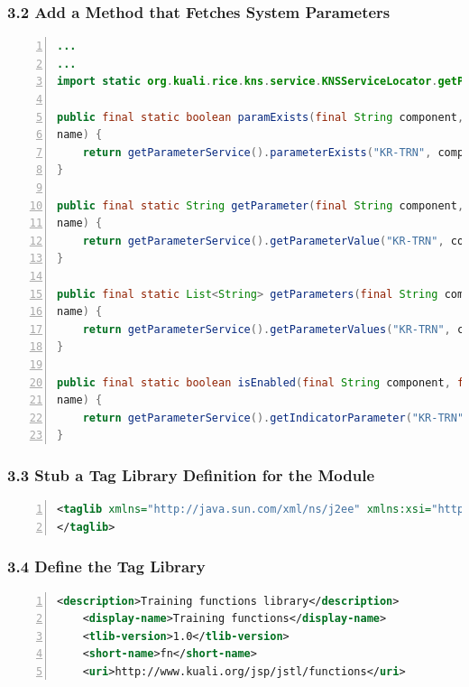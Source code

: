\subsubsection*{3.2 Add a Method that Fetches System Parameters}
\begin{lstlisting}[basicstyle=\scriptsize,numbers=left,language=java,backgroundcolor=\color{ubergray},caption={training/web/TrainingFunctions},frame=single,breaklines=true]
...
...
import static org.kuali.rice.kns.service.KNSServiceLocator.getParameterService

public final static boolean paramExists(final String component, final String
name) {
    return getParameterService().parameterExists("KR-TRN", component, name);
}

public final static String getParameter(final String component, final String
name) {
    return getParameterService().getParameterValue("KR-TRN", component, name);
}

public final static List<String> getParameters(final String component, final String
name) {
    return getParameterService().getParameterValues("KR-TRN", component, name);
}

public final static boolean isEnabled(final String component, final String
name) {
    return getParameterService().getIndicatorParameter("KR-TRN", component, name);
}
\end{lstlisting}

\subsubsection*{3.3 Stub a Tag Library Definition for the Module}
\begin{lstlisting}[basicstyle=\scriptsize,numbers=left,language=xml,backgroundcolor=\color{ubergray},caption={src/main/webapp/WEB-INF/tlds/trnfunc.tld
  Tag Library Definition},frame=single,breaklines=true]
<taglib xmlns="http://java.sun.com/xml/ns/j2ee" xmlns:xsi="http://www.w3.org/2001/XMLSchema-instance" xsi:schemaLocation="http://java.sun.com/xml/ns/j2ee http://java.sun.com/xml/ns/j2ee/web-jsptaglibrary_2_0.xsd" version="2.0">
</taglib>
\end{lstlisting}

\subsubsection*{3.4 Define the Tag Library}
\begin{lstlisting}[basicstyle=\scriptsize,numbers=left,language=xml,backgroundcolor=\color{ubergray},caption={src/main/webapp/WEB-INF/tlds/trnfunc.tld
  Tag Library Definition},frame=single,breaklines=true]
    <description>Training functions library</description>
    <display-name>Training functions</display-name>
    <tlib-version>1.0</tlib-version>
    <short-name>fn</short-name>
    <uri>http://www.kuali.org/jsp/jstl/functions</uri>
\end{lstlisting}

